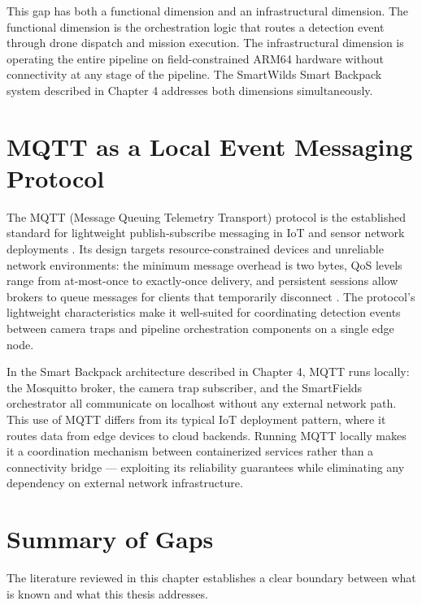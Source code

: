 This gap has both a functional dimension and an infrastructural dimension. The functional dimension is the orchestration logic that routes a detection event through drone dispatch and mission execution. The infrastructural dimension is operating the entire pipeline on field-constrained ARM64 hardware without connectivity at any stage of the pipeline. The SmartWilds Smart Backpack system described in Chapter 4 addresses both dimensions simultaneously.

\section{MQTT as a Local Event Messaging Protocol}
\label{sec:mqtt_protocol}
The MQTT (Message Queuing Telemetry Transport) protocol is the established standard for lightweight publish-subscribe messaging in IoT and sensor network deployments \cite{siyanwal2024wildlife}. Its design targets resource-constrained devices and unreliable network environments: the minimum message overhead is two bytes, QoS levels range from at-most-once to exactly-once delivery, and persistent sessions allow brokers to queue messages for clients that temporarily disconnect \cite{mqtt2019oasis}. The protocol's lightweight characteristics make it well-suited for coordinating detection events between camera traps and pipeline orchestration components on a single edge node.

In the Smart Backpack architecture described in Chapter 4, MQTT runs locally: the Mosquitto broker, the camera trap subscriber, and the SmartFields orchestrator all communicate on localhost without any external network path. This use of MQTT differs from its typical IoT deployment pattern, where it routes data from edge devices to cloud backends. Running MQTT locally makes it a coordination mechanism between containerized services rather than a connectivity bridge — exploiting its reliability guarantees while eliminating any dependency on external network infrastructure.
\section{Summary of Gaps}
\label{sec:summary_gap}
The literature reviewed in this chapter establishes a clear boundary between what is known and what this thesis addresses.

